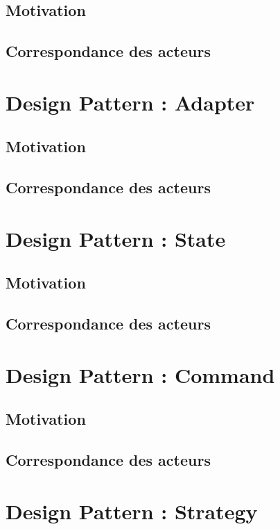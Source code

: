 \documentclass[12pt, a4paper]{article}
\begin{document}
\subsection{Motivation}


\subsection{Correspondance des acteurs}


\section{Design Pattern : Adapter}
\subsection{Motivation}


\subsection{Correspondance des acteurs}


\section{Design Pattern : State}
\subsection{Motivation}


\subsection{Correspondance des acteurs}


\section{Design Pattern : Command}
\subsection{Motivation}


\subsection{Correspondance des acteurs}


\section{Design Pattern : Strategy}
\end{document}
